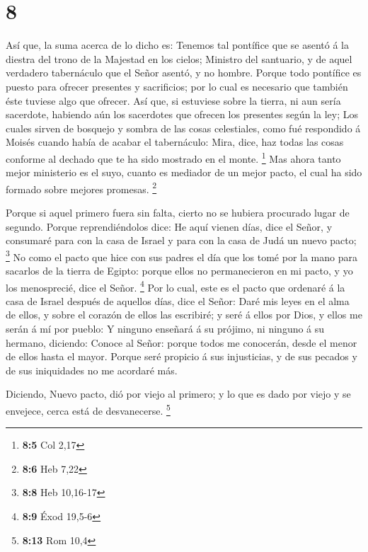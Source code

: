 \hypertarget{section-7}{%
\section{8}\label{section-7}}

 Así que, la suma acerca de lo dicho es: Tenemos tal
pontífice que se asentó á la diestra del trono de la Majestad en los
cielos;  Ministro del santuario, y de aquel verdadero
tabernáculo que el Señor asentó, y no hombre.  Porque todo
pontífice es puesto para ofrecer presentes y sacrificios; por lo cual es
necesario que también éste tuviese algo que ofrecer.  Así
que, si estuviese sobre la tierra, ni aun sería sacerdote, habiendo aún
los sacerdotes que ofrecen los presentes según la ley;  Los
cuales sirven de bosquejo y sombra de las cosas celestiales, como fué
respondido á Moisés cuando había de acabar el tabernáculo: Mira, dice,
haz todas las cosas conforme al dechado que te ha sido mostrado en el
monte. \footnote{\textbf{8:5} Col 2,17}  Mas ahora tanto
mejor ministerio es el suyo, cuanto es mediador de un mejor pacto, el
cual ha sido formado sobre mejores promesas. \footnote{\textbf{8:6} Heb
  7,22}

 Porque si aquel primero fuera sin falta, cierto no se
hubiera procurado lugar de segundo.  Porque reprendiéndolos
dice: He aquí vienen días, dice el Señor, y consumaré para con la casa
de Israel y para con la casa de Judá un nuevo pacto; \footnote{\textbf{8:8}
  Heb 10,16-17}  No como el pacto que hice con sus padres el
día que los tomé por la mano para sacarlos de la tierra de Egipto:
porque ellos no permanecieron en mi pacto, y yo los menosprecié, dice el
Señor. \footnote{\textbf{8:9} Éxod 19,5-6}  Por lo cual,
este es el pacto que ordenaré á la casa de Israel después de aquellos
días, dice el Señor: Daré mis leyes en el alma de ellos, y sobre el
corazón de ellos las escribiré; y seré á ellos por Dios, y ellos me
serán á mí por pueblo:  Y ninguno enseñará á su prójimo, ni
ninguno á su hermano, diciendo: Conoce al Señor: porque todos me
conocerán, desde el menor de ellos hasta el mayor.  Porque
seré propicio á sus injusticias, y de sus pecados y de sus iniquidades
no me acordaré más.

 Diciendo, Nuevo pacto, dió por viejo al primero; y lo que
es dado por viejo y se envejece, cerca está de desvanecerse. \footnote{\textbf{8:13}
  Rom 10,4}

